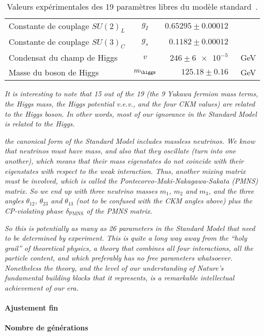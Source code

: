 \begin{table}[h]
\begin{tabular}{lcrl}
Constante de couplage $SU(2)_L$ & $g_I$ & $\num{0.65295}\pm\num{0.00012}$ & \\
Constante de couplage $SU(3)_C$ & $g_s$ & $\num{0.1182}\pm\num{0.00012}$ & \\
Condensat du champ de Higgs & $v$ & $\num{246}\pm\num{6e-5}$ & \SI{}{\GeV} \\
Masse du boson de Higgs & $m_{\higgs}$ & $\num{125.18}\pm\num{0.16}$ & \SI{}{\GeV} \\
\bottomrule
\end{tabular}
\caption{Valeurs expérimentales des 19 paramètres libres du modèle standard~\cite{PDG_booklet_2018}.}
\label{tab-19_free_SM_parameters}
\end{table}

\emph{It is interesting to note that 15 out of the 19 (the 9 Yukawa fermion mass terms, the Higgs mass, the Higgs potential v.e.v., and the four CKM values) are related to the Higgs boson. In other words, most of our ignorance in the Standard Model is related to the Higgs.}

\emph{the canonical form of the Standard Model includes massless neutrinos. We know that neutrinos must have mass, and also that they oscillate (turn into one another), which means that their mass eigenstates do not coincide with their eigenstates with respect to the weak interaction. Thus, another mixing matrix must be involved, which is called the Pontecorvo-Maki-Nakagawa-Sakata (PMNS) matrix. So we end up with three neutrino masses $m_1$, $m_2$ and $m_3$, and the three angles $\theta_{12}$, $\theta_{23}$ and $\theta_{13}$ (not to be confused with the CKM angles above) plus the CP-violating phase $\delta_{\text{PMNS}}$ of the PMNS matrix.}

\emph{So this is potentially as many as 26 parameters in the Standard Model that need to be determined by experiment. This is quite a long way away from the “holy grail” of theoretical physics, a theory that combines all four interactions, all the particle content, and which preferably has no free parameters whatsoever. Nonetheless the theory, and the level of our understanding of Nature’s fundamental building blocks that it represents, is a remarkable intellectual achievement of our era.}
\paragraph{Ajustement fin}
\paragraph{Nombre de générations}

